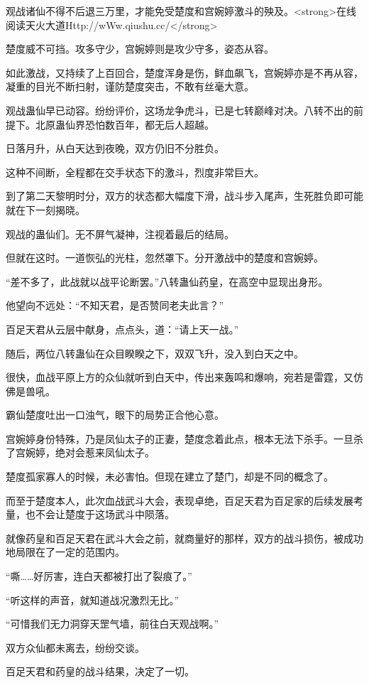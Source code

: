 \begin{this_body}
观战诸仙不得不后退三万里，才能免受楚度和宫婉婷激斗的殃及。<strong>在线阅读天火大道Http://wWw.qiushu.cc/</strong>

楚度威不可挡。攻多守少，宫婉婷则是攻少守多，姿态从容。

如此激战，又持续了上百回合，楚度浑身是伤，鲜血飙飞，宫婉婷亦是不再从容，凝重的目光不断扫射，谨防楚度突击，不敢有丝毫大意。

观战蛊仙早已动容。纷纷评价，这场龙争虎斗，已是七转巅峰对决。八转不出的前提下。北原蛊仙界恐怕数百年，都无后人超越。

日落月升，从白天达到夜晚，双方仍旧不分胜负。

这种不间断，全程都在交手状态下的激斗，烈度非常巨大。

到了第二天黎明时分，双方的状态都大幅度下滑，战斗步入尾声，生死胜负即可能就在下一刻揭晓。

观战的蛊仙们。无不屏气凝神，注视着最后的结局。

但就在这时。一道恢弘的光柱，忽然罩下。分开激战中的楚度和宫婉婷。

“差不多了，此战就以战平论断罢。”八转蛊仙药皇，在高空中显现出身形。

他望向不远处：“不知天君，是否赞同老夫此言？”

百足天君从云层中献身，点点头，道：“请上天一战。”

随后，两位八转蛊仙在众目睽睽之下，双双飞升，没入到白天之中。

很快，血战平原上方的众仙就听到白天中，传出来轰鸣和爆响，宛若是雷霆，又仿佛是兽吼。

霸仙楚度吐出一口浊气，眼下的局势正合他心意。

宫婉婷身份特殊，乃是凤仙太子的正妻，楚度念着此点，根本无法下杀手。一旦杀了宫婉婷，绝对会惹来凤仙太子。

楚度孤家寡人的时候，未必害怕。但现在建立了楚门，却是不同的概念了。

而至于楚度本人，此次血战武斗大会，表现卓绝，百足天君为百足家的后续发展考量，也不会让楚度于这场武斗中陨落。

就像药皇和百足天君在武斗大会之前，就商量好的那样，双方的战斗损伤，被成功地局限在了一定的范围内。

“嘶……好厉害，连白天都被打出了裂痕了。”

“听这样的声音，就知道战况激烈无比。”

“可惜我们无力洞穿天罡气墙，前往白天观战啊。”

双方众仙都未离去，纷纷交谈。

百足天君和药皇的战斗结果，决定了一切。


\end{this_body}
